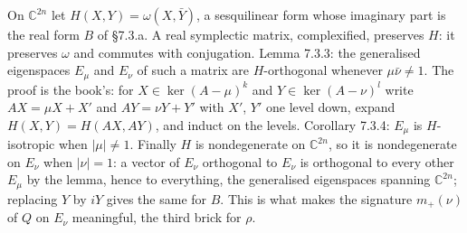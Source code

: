 \begin{lemma}
  \label{lem:7.3.3}
  \leanok
  On $\mathbb{C}^{2n}$ let $H(X, Y) = \omega(X, \bar Y)$, a sesquilinear form
  whose imaginary part is the real form $B$ of \S7.3.a.  A real symplectic
  matrix, complexified, preserves $H$: it preserves $\omega$ and commutes with
  conjugation.  Lemma 7.3.3: the generalised eigenspaces $E_\mu$ and $E_\nu$ of
  such a matrix are $H$-orthogonal whenever $\mu\bar\nu \ne 1$.  The proof is the
  book's: for $X \in \ker (A-\mu)^k$ and $Y \in \ker (A-\nu)^l$ write
  $AX = \mu X + X'$ and $AY = \nu Y + Y'$ with $X'$, $Y'$ one level down, expand
  $H(X,Y) = H(AX, AY)$, and induct on the levels.  Corollary 7.3.4: $E_\mu$ is
  $H$-isotropic when $\lvert\mu\rvert \ne 1$.  Finally $H$ is nondegenerate on
  $\mathbb{C}^{2n}$, so it is nondegenerate on $E_\nu$ when
  $\lvert\nu\rvert = 1$: a vector of $E_\nu$ orthogonal to $E_\nu$ is orthogonal
  to every other $E_\mu$ by the lemma, hence to everything, the generalised
  eigenspaces spanning $\mathbb{C}^{2n}$; replacing $Y$ by $iY$ gives the same
  for $B$.  This is what makes the signature $m_+(\nu)$ of $Q$ on $E_\nu$
  meaningful, the third brick for $\rho$.
\end{lemma}


